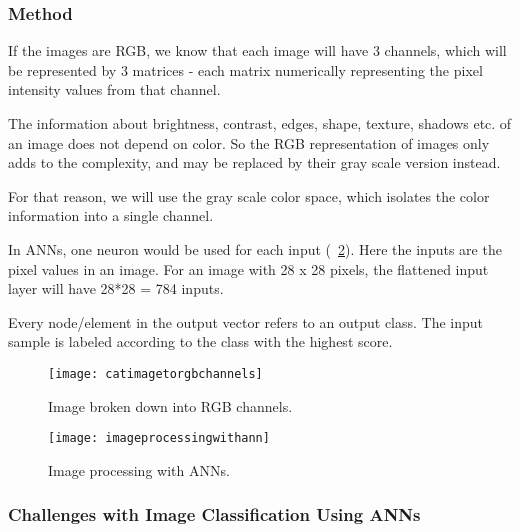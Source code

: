 	\subsubsection{Method}

	\begin{bulletedlist}
		\item If the images are RGB, we know that each image will have 3 channels, which will be represented by 3 matrices - each matrix numerically representing the pixel intensity values from that channel.
		\item The information about brightness, contrast, edges, shape, texture, shadows etc. of an image does not depend on color. So the RGB representation of images only adds to the complexity, and may be replaced by their gray scale version instead.
		\item For that reason, we will use the gray scale color space, which isolates the color information into a single channel.
		\item In ANNs, one neuron would be used for each input (\figurename~\ref{fig:imageprocessingwithann}). Here the inputs are the pixel values in an image.  For an image with 28 x 28 pixels, the flattened input layer will have 28*28 = 784 inputs.
		\item Every node/element in the output vector refers to an output class.  The input sample is labeled according to the class with the highest score.
	\end{bulletedlist}

	\begin{figure}[tbh]
		\centering
		\texttt{[image: catimagetorgbchannels]}
		\caption[Image broken down into RGB channels]{Image broken down into RGB channels.}
		\label{fig:catimagetorgbchannels}
	\end{figure}

	\begin{figure}[tbh]
		\centering
		\texttt{[image: imageprocessingwithann]}
		\caption[Image processing with ANNs]{Image processing with ANNs.}
		\label{fig:imageprocessingwithann}
	\end{figure}


	\subsubsection{Challenges with Image Classification Using ANNs}

